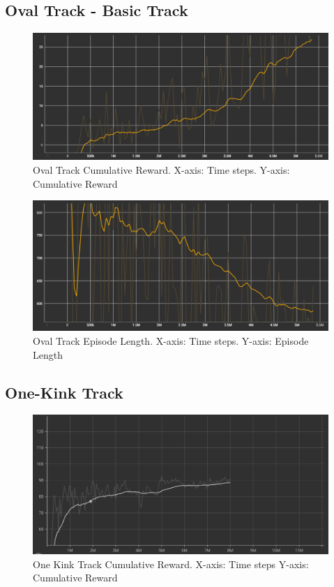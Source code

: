 \subsection{Oval Track - Basic Track}
\begin{figure}[H]
    \centering
    \includegraphics[width=1.0\textwidth]{images/graphs/OvalTrack-Reward.png}
    \caption{Oval Track Cumulative Reward. X-axis: Time steps. Y-axis: Cumulative Reward}
    \label{fig:1}
\end{figure}
\begin{figure}[H]
    \centering
    \includegraphics[width=1.0\textwidth]{images/graphs/OvalTrack-Episode.png}
    \caption{Oval Track Episode Length. X-axis: Time steps. Y-axis: Episode Length}
    \label{fig:2}
\end{figure}

\subsection{One-Kink Track}

\begin{figure}[H]
    \centering
    \includegraphics[width=1.0\textwidth]{images/graphs/OneKink-Reward.png}
    \caption{One Kink Track Cumulative Reward.  X-axis: Time steps  Y-axis: Cumulative Reward}
    \label{fig:3}
\end{figure}

